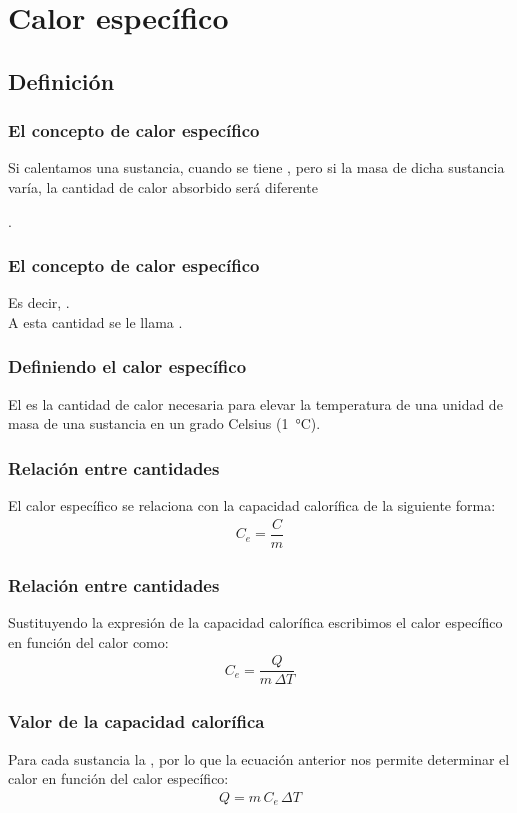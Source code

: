 \documentclass[14pt]{beamer}
\begin{document}
\section{Calor específico}
\subsection{Definición}

\begin{frame}
\frametitle{El concepto de calor específico}
Si calentamos una sustancia,  cuando se tiene , \pause pero si la masa de dicha sustancia varía, la cantidad de calor absorbido será diferente
\end{frame}.
\begin{frame}
\frametitle{El concepto de calor específico}
Es decir, .
\\
\bigskip
\pause
A esta cantidad se le llama .
\end{frame}
\begin{frame}
\frametitle{Definiendo el calor específico}
El  es la cantidad de calor necesaria para elevar la temperatura de una unidad de masa de una sustancia en un grado Celsius (\SI{1}{\degreeCelsius}).
\end{frame}
\begin{frame}
\frametitle{Relación entre cantidades}
El calor específico se relaciona con la capacidad calorífica de la siguiente forma:
\pause
\begin{align*}
C_{e} = \dfrac{C}{m}
\end{align*}
\end{frame}
\begin{frame}
\frametitle{Relación entre cantidades}
Sustituyendo la expresión de la capacidad calorífica escribimos el calor específico en función del calor como:
\pause
\begin{align*}
C_{e} = \dfrac{Q}{m \, \Delta T}
\end{align*}
\end{frame}
\begin{frame}
\frametitle{Valor de la capacidad calorífica}
Para cada sustancia la , \pause por lo que la ecuación anterior nos permite determinar el calor en función del calor específico:
\pause
\begin{align*}
Q = m \, C_{e} \, \Delta T
\end{align*}
\end{frame}
\end{document}

